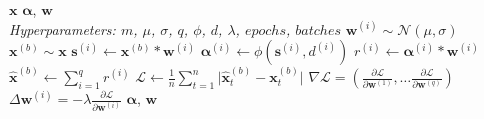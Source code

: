 \begin{algorithmic}[1]
	\renewcommand{\algorithmicrequire}{\textbf{Input:}}
	\renewcommand{\algorithmicensure}{\textbf{Output:}}
	\REQUIRE $\bm{x}$
	\ENSURE $\bm{\alpha}$, $\bm{w}$
	\\ \textit{Hyperparameters:  $m$, $\mu$, $\sigma$, $q$, $\phi$, $d$, $\lambda$, $epochs$, $batches$}
	\STATE $\bm{w}^{(i)} \sim \mathcal{N}(\mu, \sigma)$
	\ENDFOR
	\STATE $\bm{x}^{(b)} \sim \bm{x}$
	\STATE $\bm{s}^{(i)} \leftarrow \bm{x}^{(b)} * \bm{w}^{(i)}$
	\STATE $\bm{\alpha}^{(i)} \leftarrow \phi(\bm{s}^{(i)}, d^{(i)})$
	\STATE $r^{(i)} \leftarrow \bm{\alpha}^{(i)} * \bm{w}^{(i)}$
	\ENDFOR
	\STATE $\hat{\bm{x}}^{(b)} \leftarrow \sum\limits_{i=1}^q r^{(i)}$
	\STATE $\mathcal{L} \leftarrow \frac{1}{n}\sum\limits_{t=1}^n \lvert\hat{\bm{x}}^{(b)}_t - \bm{x}^{(b)}_t \rvert$
	\STATE $\nabla\mathcal{L} = \left( \frac{\partial\mathcal{L}}{\partial\bm{w}^{(1)}},\ldots\frac{\partial\mathcal{L}}{\partial\bm{w}^{(q)}}\right)$
	\STATE $\Delta\bm{w}^{(i)} = -\lambda\frac{\partial\mathcal{L}}{\partial\bm{w}^{(i)}}$
	\ENDFOR
	\ENDFOR
	\RETURN $\bm{\alpha}$, $\bm{w}$
\end{algorithmic}
